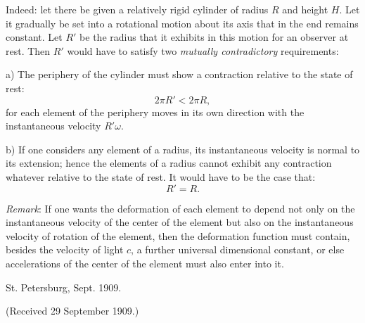 \documentclass[12pt,a4paper]{article}
\begin{document}
Indeed: let there be given a relatively rigid cylinder of radius $R$ and height $H$. Let it gradually be set into a rotational motion about its axis that in the end remains constant. Let $R'$ be the radius that it exhibits in this motion for an observer at rest. Then $R'$ would have to satisfy two \emph{mutually contradictory} requirements:

a) The periphery of the cylinder must show a contraction relative to the state of rest:
\[ 2\pi R'<2\pi R, \]
for each element of the periphery moves in its own direction with the instantaneous velocity $R'\omega$.

b) If one considers any element of a radius, its instantaneous velocity is normal to its extension; hence the elements of a radius cannot exhibit any contraction whatever relative to the state of rest. It would have to be the case that:
\[ R'=R. \]

\emph{Remark}: If one wants the deformation of each element to depend not only on the instantaneous velocity of the center of the element but also on the instantaneous velocity of rotation of the element, then the deformation function must contain, besides the velocity of light $c$, a further universal dimensional constant, or else accelerations of the center of the element must also enter into it.

St. Petersburg, Sept. 1909.

\begin{flushright}\small (Received 29 September 1909.)\end{flushright}
\end{document}
